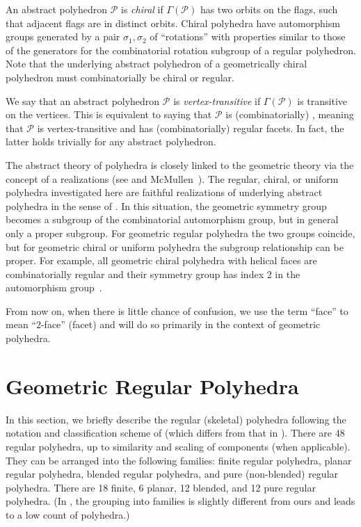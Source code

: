 \documentclass[12pt]{article}
\theoremstyle{definition}\newtheorem{definition}{Definition}[section]
\begin{document}
An abstract polyhedron $\mathcal{P}$ is {\em chiral\/} if $\Gamma(\mathcal{P})$ has two orbits on the flags, such that adjacent flags are in distinct orbits. Chiral polyhedra have automorphism groups generated by a pair $\sigma_1,\sigma_2$ of ``rotations'' with properties similar to those of the generators for the combinatorial rotation subgroup of a regular polyhedron. Note that the underlying abstract polyhedron of a geometrically chiral polyhedron must combinatorially be chiral or regular.
\smallskip

We say that an abstract polyhedron $\mathcal{P}$ is \textit{vertex-transitive} if $\Gamma(\mathcal{P})$ is transitive on the vertices. This is equivalent to saying that $\mathcal{P}$ is (combinatorially) , meaning that $\mathcal{P}$ is vertex-transitive and has (combinatorially) regular facets. In fact, the latter holds trivially for any abstract polyhedron.
\smallskip

The abstract theory of polyhedra is closely linked to the geometric theory via the concept of a realizations (see \cite[Ch.5]{41} and McMullen~\cite{McMullen New Book}). The regular, chiral, or uniform polyhedra investigated here are faithful realizations of underlying abstract polyhedra in the sense of \cite{41,McMullen New Book}. In this situation, the geometric symmetry group becomes a subgroup of the combinatorial automorphism group, but in general only a proper subgroup. For geometric regular polyhedra the two groups coincide, but for geometric chiral or uniform polyhedra the subgroup relationship can be proper. For example, all geometric chiral polyhedra with helical faces are combinatorially regular and their symmetry group has index 2 in the automorphism group~\cite{47}. 
\smallskip

From now on, when there is little chance of confusion, we use the term ``face'' to mean ``$2$-face'' (facet) and will do so primarily in the context of geometric polyhedra. 

\section{Geometric Regular Polyhedra}
\label{regpo}

In this section, we briefly describe the regular (skeletal) polyhedra following the notation and classification scheme of \cite[Ch.~7E]{41} (which differs from that in \cite{18,19,22}). There are 48 regular polyhedra, up to similarity and scaling of components (when applicable). They can be arranged into the following families: finite regular polyhedra, planar regular polyhedra, blended regular polyhedra, and pure (non-blended) regular polyhedra. There are 18 finite, 6 planar, 12 blended, and 12 pure regular polyhedra. (In \cite{18,19,22}, the grouping into families is slightly different from ours and leads to a low count of polyhedra.)\smallskip 
\end{document}

